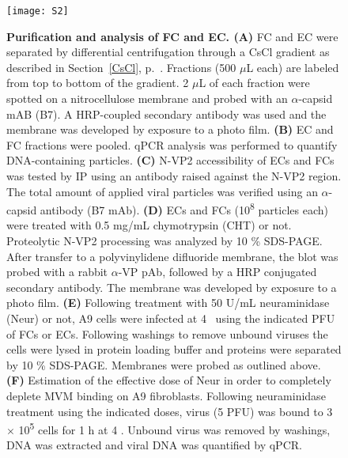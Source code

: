 \begin{figure}

  \begin{minipage}{\textwidth}
\centering
  \texttt{[image: S2]} \\[0.3cm]
  \caption[Purification and Analysis of FC and EC]
   {\textbf{Purification and analysis of FC and EC. (A)} FC and EC were separated by differential centrifugation through a CsCl gradient as described in Section~\ref{CsCl}, p.~\pageref{CsCl}. Fractions (500 $\mu$L each) are labeled from top to bottom of the gradient. 2 $\mu$L of each fraction were spotted on a nitrocellulose membrane and probed with an $\alpha$-capsid mAB (B7). A HRP-coupled secondary antibody was used and the membrane was developed by exposure to a photo film. \textbf{(B)} EC and FC fractions were pooled. qPCR analysis was performed to quantify DNA-containing particles. \textbf{(C)} N-VP2 accessibility of ECs and FCs was tested by IP using an antibody raised against the N-VP2 region. The total amount of applied viral particles was verified using an $\alpha$-capsid antibody (B7 mAb). \textbf{(D)} ECs and FCs (10\textsuperscript{8} particles each) were treated with 0.5 mg/mL chymotrypsin (CHT) or not. Proteolytic N-VP2 processing was analyzed by 10 \% SDS-PAGE. After transfer to a polyvinylidene difluoride membrane, the blot was probed with a rabbit $\alpha$-VP pAb, followed by a HRP conjugated secondary antibody. The membrane was developed by exposure to a photo film. \textbf{(E)} Following treatment with 50 U/mL neuraminidase (Neur) or not, A9 cells were infected at 4 \textcelsius~using the indicated PFU of FCs or ECs\footnotemark. Following washings to remove unbound viruses the cells were lysed in protein loading buffer and proteins were separated by 10 \% SDS-PAGE. Membranes were probed as outlined above. \textbf{(F)} Estimation of the effective dose of Neur in order to completely deplete MVM binding on A9 fibroblasts. Following neuraminidase treatment using the indicated doses, virus (5 PFU) was bound to 3 $\times$ 10\textsuperscript{5} cells for 1 h at 4 \textcelsius. Unbound virus was removed by washings, DNA was extracted and viral DNA was quantified by qPCR.} 
\label{S2}

\vspace{0.9cm}

 \end{minipage}

\end{figure}





